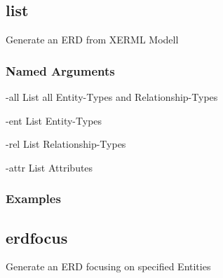 \documentclass[letterpaper,10pt,english,openany,oneside]{sphinxmanual}
\begin{document}
\begin{sphinxVerbatim}[commandchars=\\\{\}]
  \PYG{p}{[}\PYG{p}{]}
\end{sphinxVerbatim}


\subsection{list}
\label{\detokenize{cmd_main:list}}
Generate an ERD from XERML Modell

\begin{sphinxVerbatim}[commandchars=\\\{\}]
  \PYG{p}{[}\PYG{p}{]} \PYG{p}{[}\PYG{p}{]} \PYG{p}{[}\PYG{p}{]} \PYG{p}{[}\PYG{p}{]} \PYG{p}{[}\PYG{p}{]}
\end{sphinxVerbatim}


\subsubsection{Named Arguments}
\label{\detokenize{cmd_main:Named Arguments_repeat4}}\begin{optionlist}{3cm}
\item [-all]  
List all Entity-Types and Relationship-Types
\item [-ent]  
List Entity-Types
\item [-rel]  
List Relationship-Types
\item [-attr]  
List Attributes
\end{optionlist}

\subsubsection{Examples}
\begin{sphinxVerbatim}[commandchars=\\\{\}]
    
\end{sphinxVerbatim}
\begin{sphinxVerbatim}[commandchars=\\\{\}]
   
\end{sphinxVerbatim}

\subsection{erdfocus}
\label{\detokenize{cmd_main:erdfocus}}
Generate an ERD focusing on specified Entities
\end{document}
